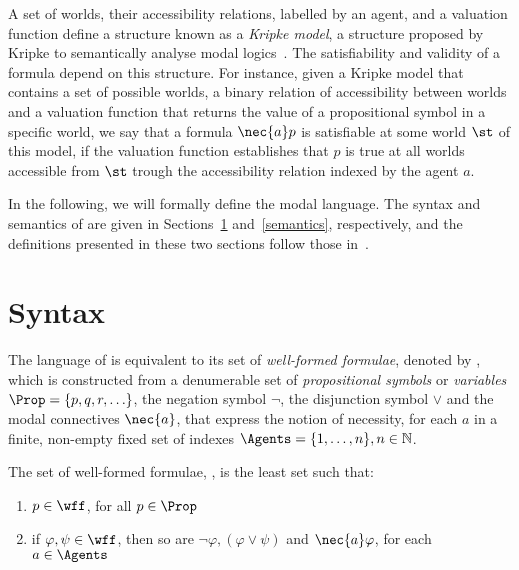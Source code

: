 A set of worlds, their accessibility relations, labelled by an agent, and a
valuation function define a structure known as a \emph{Kripke model}, a
structure proposed by Kripke to semantically analyse modal
logics~\cite{kripke:i}.  The satisfiability and validity of a formula depend on
this structure. For instance, given a Kripke model that contains a set of
possible worlds, a binary relation of accessibility between worlds and a
valuation function that returns the value of a propositional symbol in a
specific world, we say that a formula $\nec{a}p$ is satisfiable at some world
$\st$ of this model, if the valuation function establishes that $p$ is true at
all worlds accessible from $\st$ trough the accessibility relation indexed by
the agent $a$.

In the following, we will formally define the modal language. The
syntax and semantics of  are given in Sections~\ref{syntax}
and~\ref{semantics}, respectively, and the definitions presented in these two
sections follow those in~\cite{journals/jal/NalonD07}.

\section{Syntax}%
\label{syntax}

The language of  is equivalent to its set of \emph{well-formed
formulae}, denoted by \wff, which is constructed from a denumerable set of
\emph{propositional symbols} or \emph{variables} $\Prop = \{p, q, r, \ldots\}$,
the negation symbol $\neg$, the disjunction symbol $\lor$ and the modal
connectives $\nec{a}$, that express the notion of necessity, for each $a$
in a finite, non-empty fixed set of indexes $\Agents = \{1, \ldots, n\}, n \in
\mathbb{N}$.

\begin{definition}%
\label{def:wff}
    The set of well-formed formulae, \wff, is the least set such that:
    \begin{enumerate}
        \item $p \in \wff$, for all $p \in \Prop$
            \vspace{.2ex}
        \item if $\varphi, \psi \in \wff$, then so are $\neg \varphi, (\varphi
            \lor \psi)$ and $\nec{a} \varphi$, for each $a \in \Agents$
    \end{enumerate}
\end{definition}

